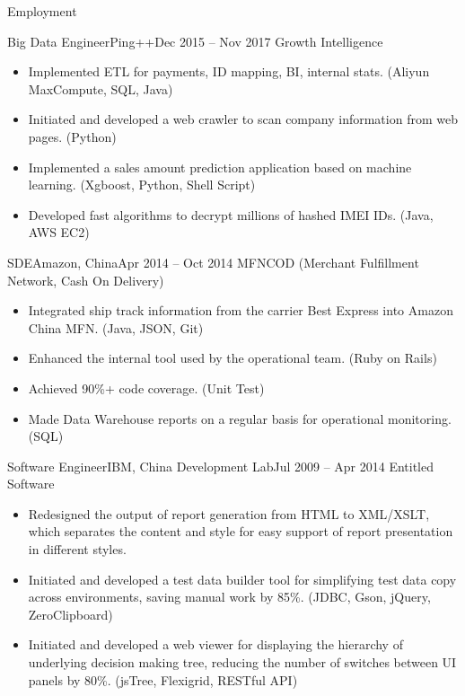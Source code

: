 \documentclass[]{mcdowellcv}
\begin{document}
	\makeheader
	
	\begin{cvsection}{Employment}
		\begin{cvsubsection}{Big Data Engineer}{Ping++}{Dec 2015 – Nov 2017}
			Growth Intelligence
			\begin{itemize}
				\item Implemented ETL for payments, ID mapping, BI, internal stats. (Aliyun MaxCompute, SQL, Java)
				\item Initiated and developed a web crawler to scan company information from web pages. (Python)
				\item Implemented a sales amount prediction application based on machine learning. (Xgboost, Python, Shell Script)
				\item Developed fast algorithms to decrypt millions of hashed IMEI IDs. (Java, AWS EC2)
			\end{itemize}
		\end{cvsubsection}
		
		\begin{cvsubsection}{SDE}{Amazon, China}{Apr 2014 – Oct 2014}
			MFNCOD (Merchant Fulfillment Network, Cash On Delivery)
			\begin{itemize}
				\item Integrated ship track information from the carrier Best Express into Amazon China MFN. (Java, JSON, Git)
				\item Enhanced the internal tool used by the operational team. (Ruby on Rails)
				\item Achieved 90\%+ code coverage. (Unit Test)
				\item Made Data Warehouse reports on a regular basis for operational monitoring. (SQL)
			\end{itemize}
		\end{cvsubsection}
		
		\begin{cvsubsection}{Software Engineer}{IBM, China Development Lab}{Jul 2009 – Apr 2014}
			Entitled Software
			\begin{itemize}
				\item Redesigned the output of report generation from HTML to XML/XSLT, which separates the content and style for easy support of report presentation in different styles.
				\item Initiated and developed a test data builder tool for simplifying test data copy across environments, saving manual work by 85\%. (JDBC, Gson, jQuery, ZeroClipboard)
				\item Initiated and developed a web viewer for displaying the hierarchy of underlying decision making tree, reducing the number of switches between UI panels by 80\%. (jsTree, Flexigrid, RESTful API)
			\end{itemize}
		\end{cvsubsection}
	\end{cvsection}
	
\end{document}
